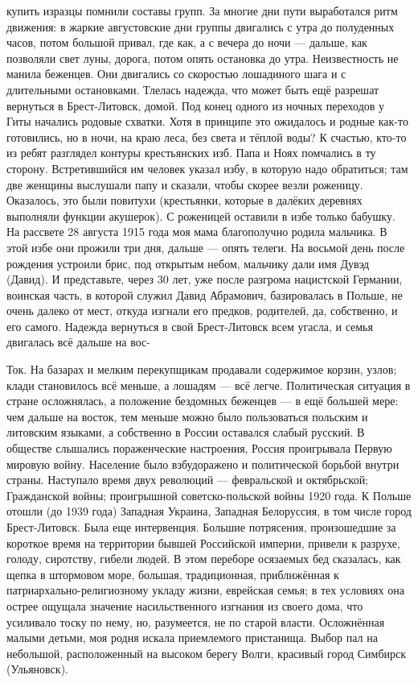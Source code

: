купить изразцы помнили составы групп. За многие дни пути выработался ритм движения: в жаркие августовские дни группы двигались с утра до полуденных часов, потом большой привал, где как, а с вечера до ночи — дальше, как позволяли свет луны, дорога, потом опять остановка до утра. Неизвестность не манила беженцев. Они двигались со скоростью лошадиного шага и с длительными остановками. Тлелась надежда, что может быть ещё разрешат вернуться в Брест-Литовск, домой. Под конец одного из ночных переходов у Гиты начались родовые схватки. Хотя в принципе это ожидалось и родные как-то готовились, но в ночи, на краю леса, без света и тёплой воды? К счастью, кто-то из ребят разглядел контуры крестьянских изб. Папа и Ноях помчались в ту сторону. Встретившийся им человек указал избу, в которую надо обратиться; там две женщины выслушали папу и сказали, чтобы скорее везли роженицу. Оказалось, это были повитухи (крестьянки, которые в далёких деревнях выполняли функции акушерок). С роженицей оставили в избе только бабушку. На рассвете 28 августа 1915 года моя мама благополучно родила мальчика. В этой избе они прожили три дня, дальше — опять телеги. На восьмой день после рождения устроили брис, под открытым небом, мальчику дали имя Дувэд (Давид). И представьте, через 30 лет, уже после разгрома нацистской Германии, воинская часть, в которой служил Давид Абрамович, базировалась в Польше, не очень далеко от мест, откуда изгнали его предков, родителей, да, собственно, и его самого. Надежда вернуться в свой Брест-Литовск всем угасла, и семья двигалась всё дальше на вос-

Ток. На базарах и мелким перекупщикам продавали содержимое корзин, узлов; клади становилось всё меньше, а лошадям — всё легче. Политическая ситуация в стране осложнялась, а положение бездомных беженцев — в ещё большей мере: чем дальше на восток, тем меньше можно было пользоваться польским и литовским языками, а собственно в России оставался слабый русский. В обществе слышались пораженческие настроения, Россия проигрывала Первую мировую войну. Население было взбудоражено и политической борьбой внутри страны. Наступало время двух революций — февральской и октябрьской; Гражданской войны; проигрышной советско-польской войны 1920 года. К Польше отошли (до 1939 года) Западная Украина, Западная Белоруссия, в том числе город Брест-Литовск. Была еще интервенция. Большие потрясения, произошедшие за короткое время на территории бывшей Российской империи, привели к разрухе, голоду, сиротству, гибели людей. В этом переборе осязаемых бед сказалась, как щепка в штормовом море, большая, традиционная, приближённая к патриархально-религиозному укладу жизни, еврейская семья; в тех условиях она острее ощущала значение насильственного изгнания из своего дома, что усиливало тоску по нему, но, разумеется, не по старой власти. Осложнённая малыми детьми, моя родня искала приемлемого пристанища. Выбор пал на небольшой, расположенный на высоком берегу Волги, красивый город Симбирск (Ульяновск).

